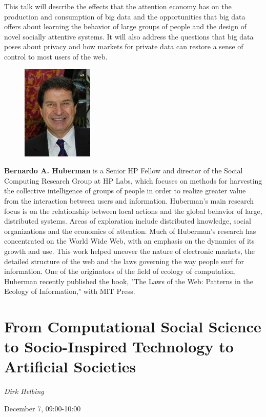 This talk will describe the effects that the attention economy has on the
production and consumption of big data and the opportunities that big data
offers about learning the behavior of large groups of people and the design of
novel socially attentive systems. It will also address the questions that big
data poses about privacy and how markets for private data can restore a sense of
control to most users of the web.\\

\begin{figure}
  \includegraphics{bernardo_huberman}
\end{figure}

\noindent\textbf{Bernardo A. Huberman} is a Senior HP Fellow and director of
the Social Computing Research Group at HP Labs, which focuses on methods for
harvesting the collective intelligence of groups of people in order to realize
greater value from the interaction between users and information. Huberman’s
main research focus is on the relationship between local actions and the global
behavior of large, distributed systems. Areas of exploration include distributed
knowledge, social organizations and the economics of attention. Much of
Huberman's research has concentrated on the World Wide Web, with an emphasis on
the dynamics of its growth and use. This work helped uncover the nature of
electronic markets, the detailed structure of the web and the laws governing the
way people surf for information. One of the originators of the field of ecology
of computation, Huberman recently published the book, "The Laws of the Web:
Patterns in the Ecology of Information," with MIT Press.

\section{From Computational Social Science to Socio-Inspired Technology to
Artificial Societies}

\noindent \textit{Dirk Helbing}

\noindent December 7, 09:00-10:00
\\

